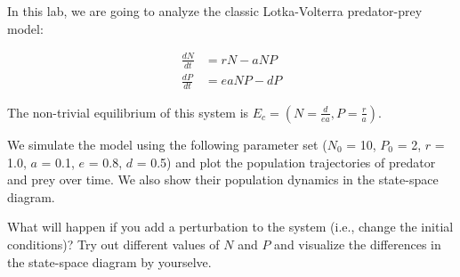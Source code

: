 \documentclass[
]{book}
\begin{document}
In this lab, we are going to analyze the classic Lotka-Volterra predator-prey model:

\begin{align*}
\frac {dN}{dt} &= rN-aNP\\
\frac {dP}{dt} &= eaNP-dP
\end{align*}

The non-trivial equilibrium of this system is \(E_c = (N = \frac{d}{ea}, P = \frac{r}{a})\).

We simulate the model using the following parameter set (\(N_0\) = 10, \(P_0\) = 2, \(r\) = 1.0, \(a\) = 0.1, \(e\) = 0.8, \(d\) = 0.5) and plot the population trajectories of predator and prey over time. We also show their population dynamics in the state-space diagram.

What will happen if you add a perturbation to the system (i.e., change the initial conditions)? Try out different values of \(N\) and \(P\) and visualize the differences in the state-space diagram by yourselve.
\end{document}
